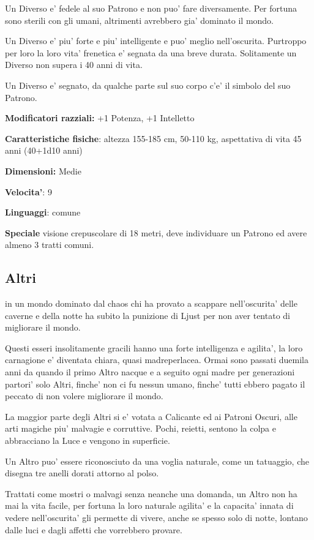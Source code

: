 \documentclass[a4paper,11pt,twoside,openany]{dndbook}
\begin{document}
Un Diverso e' fedele al suo Patrono e non puo' fare diversamente. Per fortuna sono sterili con gli umani, altrimenti avrebbero gia' dominato il mondo.

Un Diverso e' piu' forte e piu' intelligente e puo' meglio nell'oscurita. Purtroppo per loro la loro vita' frenetica e' segnata da una breve durata. Solitamente un Diverso non supera i 40 anni di vita.

Un Diverso e' segnato, da qualche parte sul suo corpo c'e' il simbolo del suo Patrono.

\textbf{Modificatori razziali:} +1 Potenza, +1 Intelletto

\textbf{Caratteristiche fisiche}: altezza 155-185 cm, 50-110 kg, aspettativa di vita 45 anni (40+1d10 anni)

\textbf{Dimensioni:} Medie

\textbf{Velocita'}: 9

\textbf{Linguaggi}: comune

\textbf{Speciale} visione crepuscolare di 18 metri, deve individuare un Patrono ed avere almeno 3 tratti comuni.

\subsection{Altri}

\label{altri}

in un mondo dominato dal chaos chi ha provato a scappare nell'oscurita' delle caverne e della notte ha subito la punizione di Ljust per non aver tentato di migliorare il mondo.

Questi esseri insolitamente gracili hanno una forte intelligenza e agilita', la loro carnagione e' diventata chiara, quasi madreperlacea. Ormai sono passati duemila anni da quando il primo Altro nacque e a seguito ogni madre per generazioni partori' solo Altri, finche' non ci fu nessun umano, finche' tutti ebbero pagato il peccato di non volere migliorare il mondo.

La maggior parte degli Altri si e' votata a Calicante ed ai Patroni Oscuri, alle arti magiche piu' malvagie e corruttive. Pochi, reietti, sentono la colpa e abbracciano la Luce e vengono in superficie.

Un Altro puo' essere riconosciuto da una voglia naturale, come un tatuaggio, che disegna tre anelli dorati attorno al polso.

Trattati come mostri o malvagi senza neanche una domanda, un Altro non ha mai la vita facile, per fortuna la loro naturale agilita' e la capacita' innata di vedere nell'oscurita' gli permette di vivere, anche se spesso solo di notte, lontano dalle luci e dagli affetti che vorrebbero provare.
\end{document}
